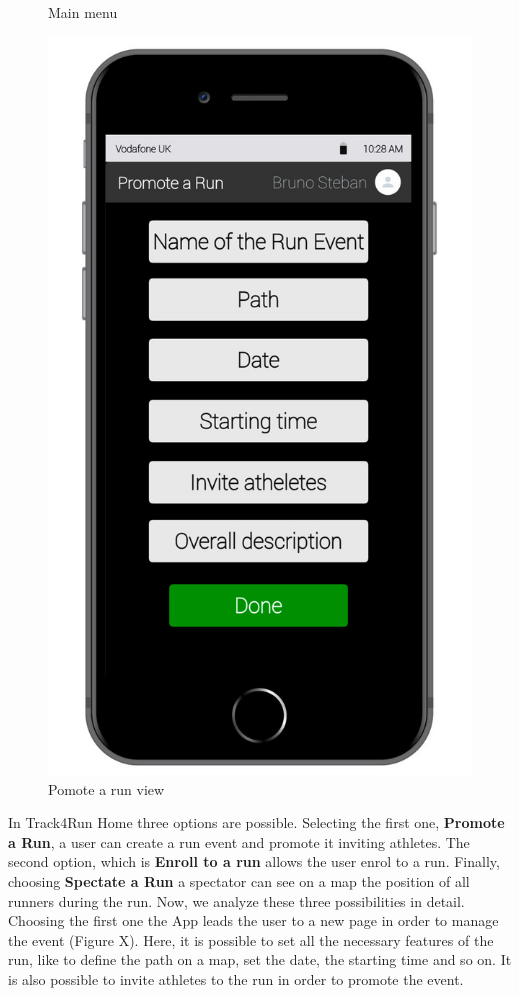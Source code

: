 \begin{enumerate}
\begin{figure}[H]
\begin{center}
\begin{minipage}[c]{.40\textwidth}
	\caption{Main menu}
        \end{minipage}%
        \hspace{10mm}%
        \begin{minipage}[c]{.40\textwidth}
        \centering
          \includegraphics[height=14 cm]{Images/Mockups/Track4RunMockup6.jpg}
	\caption{Pomote a run view}
        \end{minipage}
      \end{center}
\end{figure}
In Track4Run Home three options are possible. Selecting the first one, \textbf{Promote a Run}, a user can create a run event and promote it inviting athletes. The second option, which is \textbf{Enroll to a run} allows the user enrol to a run. Finally, choosing \textbf{Spectate a Run} a spectator can see on a map the position of all runners during the run. Now, we analyze these three possibilities in detail. Choosing the first one the App leads the user to a new page in order to manage the event (Figure X). Here, it is possible to set all the necessary features of the run, like to define the path on a map, set the date, the starting time and so on. It is also possible to invite athletes to the run in order to promote the event.
\clearpage
\begin{figure}[H]

\end{figure}
\end{enumerate}
